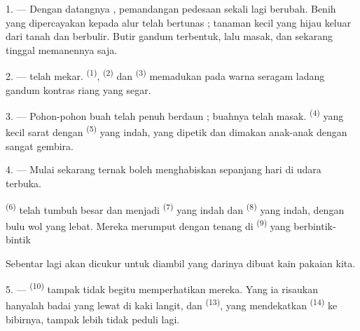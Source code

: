 \VUsaut{5.0mm}
\VUsaut{3.0mm}
\VUsaut{3.0mm}
\VUsaut{4.0mm}
\VUsaut{3.0mm}

1. --- Dengan datangnya , pemandangan pedesaan
sekali lagi berubah. Benih yang dipercayakan kepada alur telah
bertunas ; tanaman kecil yang hijau keluar dari tanah dan berbulir.
Butir gandum terbentuk, lalu masak, dan sekarang tinggal memanennya
saja.

2. ---  telah mekar.  \textsuperscript{(1)}, 
\textsuperscript{(2)} dan 
\textsuperscript{(3)} memadukan pada warna seragam ladang gandum
kontras riang  yang segar.

3. --- Pohon-pohon buah telah penuh berdaun ; buahnya telah masak.
 \textsuperscript{(4)} yang kecil sarat dengan
 \textsuperscript{(5)} yang indah, yang dipetik dan
dimakan anak-anak dengan sangat gembira.

4. --- Mulai sekarang ternak boleh menghabiskan sepanjang hari di
udara terbuka.

 \textsuperscript{(6)} telah tumbuh besar dan
menjadi  \textsuperscript{(7)} yang indah dan
 \textsuperscript{(8)} yang indah, dengan
bulu wol yang lebat. Mereka merumput dengan tenang di
  \textsuperscript{(9)} yang
berbintik-bintik 

Sebentar lagi  akan dicukur untuk
diambil  yang darinya dibuat kain pakaian kita.

\VUsaut{5.0mm}
\VUsaut{3.4mm}

5. ---  \textsuperscript{(10)} tampak tidak begitu
memperhatikan mereka. Yang ia risaukan hanyalah badai yang lewat di
kaki langit, dan  \textsuperscript{(13)}, yang
mendekatkan  \textsuperscript{(14)} ke bibirnya,
tampak lebih tidak peduli lagi.

